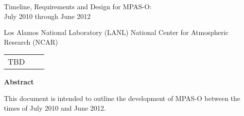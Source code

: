  Timeline, Requirements and Design for MPAS-O: \\
July 2010 through June 2012
\newline

 \newline
\indent Los Alamos National Laboratory (LANL) \newline
\indent National Center for Atmospheric Research (NCAR) \newline

 \newline
\indent \begin{tabular}{lll}
TBD
\end{tabular} \newline

\begin{center}{\bf Abstract}\end{center}
This document is intended to outline the development of MPAS-O between the times of July 2010 and June 2012.
